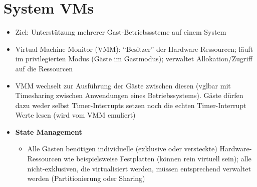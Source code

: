 \section{System VMs}
\begin{itemize}
	\item Ziel: Unterstützung mehrerer Gast-Betriebsssteme auf einem System
	\item Virtual Machine Monitor (VMM): "`Besitzer"' der Hardware-Ressourcen; läuft im privilegierten Modus (Gäste im Gastmodus); verwaltet Allokation/Zugriff auf die Ressourcen
	\item VMM wechselt zur Ausführung der Gäste zwischen diesen (vglbar mit Timesharing zwischen Anwendungen eines Betriebssystems). Gäste dürfen dazu weder selbst Timer-Interrupts setzen noch die echten Timer-Interrupt Werte lesen (wird vom VMM emuliert) %
	\item \textbf{State Management}
	\begin{itemize}
		\item Alle Gästen benötigen individuelle (exklusive oder versteckte) Hardware-Ressourcen wie beispielsweise Festplatten (können rein virtuell sein); alle nicht-exklusiven, die virtualisiert werden, müssen entsprechend verwaltet werden (Partitionierung oder Sharing)
	\end{itemize}
\end{itemize}




























